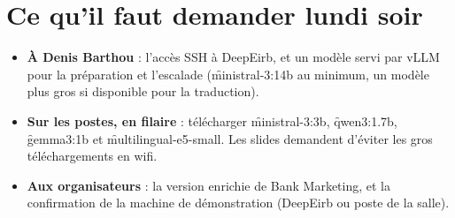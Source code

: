 \section{Ce qu'il faut demander lundi soir}

\begin{itemize}
  \item \textbf{À Denis Barthou} : l'accès SSH à DeepEirb, et un modèle servi par vLLM pour la
        préparation et l'escalade (\f{ministral-3:14b} au minimum, un modèle plus gros si
        disponible pour la traduction).
  \item \textbf{Sur les postes, en filaire} : télécharger \f{ministral-3:3b}, \f{qwen3:1.7b},
        \f{gemma3:1b} et \f{multilingual-e5-small}. Les slides demandent d'éviter les gros
        téléchargements en wifi.
  \item \textbf{Aux organisateurs} : la version enrichie de Bank Marketing, et la confirmation de
        la machine de démonstration (DeepEirb ou poste de la salle).
\end{itemize}
